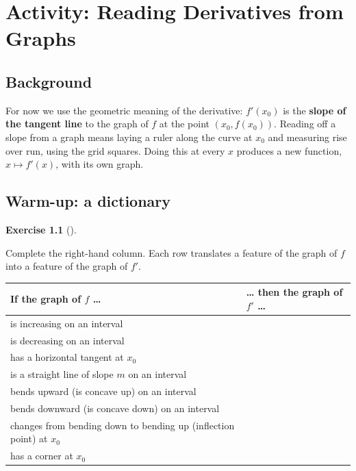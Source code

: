 \documentclass[
  letterpaper,
  DIV=11,
  numbers=noendperiod]{scrreprt}
\newcounter{none} %
\theoremstyle{plain}
\theoremstyle{plain}
\theoremstyle{definition}
\theoremstyle{definition}
\newtheorem{exercise}{Exercise}[chapter]
\theoremstyle{definition}
\theoremstyle{plain}
\theoremstyle{plain}
\theoremstyle{remark}
\begin{document}
\chapter{Activity: Reading Derivatives from
Graphs}\label{activity-reading-derivatives-from-graphs}

\section{Background}\label{background-1}

For now we use the geometric meaning of the derivative: \(f'(x_0)\) is
the \textbf{slope of the tangent line} to the graph of \(f\) at the
point \((x_0, f(x_0))\). Reading off a slope from a graph means laying a
ruler along the curve at \(x_0\) and measuring rise over run, using the
grid squares. Doing this at every \(x\) produces a new function,
\(x \mapsto f'(x)\), with its own graph.

\section{Warm-up: a dictionary}\label{warm-up-a-dictionary}

\begin{exercise}[]\protect\hypertarget{exr-deriv-dictionary}{}\label{exr-deriv-dictionary}

Complete the right-hand column. Each row translates a feature of the
graph of \(f\) into a feature of the graph of \(f'\).

{\def\LTcaptype{none} %
\begin{longtable}[]{@{}
  >{\raggedright\arraybackslash}p{}
  >{\raggedright\arraybackslash}p{}@{}}
\toprule\noalign{}
\begin{minipage}[b]{\linewidth}\raggedright
If the graph of \(f\) \ldots{}
\end{minipage} & \begin{minipage}[b]{\linewidth}\raggedright
\ldots{} then the graph of \(f'\) \ldots{}
\end{minipage} \\
\midrule\noalign{}
\endhead
\bottomrule\noalign{}
\endlastfoot
is increasing on an interval & ~ \\
is decreasing on an interval & ~ \\
has a horizontal tangent at \(x_0\) & ~ \\
is a straight line of slope \(m\) on an interval & ~ \\
bends upward (is concave up) on an interval & ~ \\
bends downward (is concave down) on an interval & ~ \\
changes from bending down to bending up (inflection point) at \(x_0\) &
~ \\
has a corner at \(x_0\) & ~ \\
\end{longtable}
}

\end{exercise}
\end{document}
